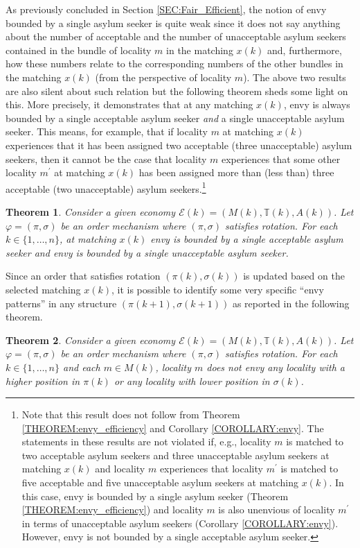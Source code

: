 \documentclass[12pt,fleqn]{article}
\newtheorem{theorem}{Theorem}
\begin{document}
\noindent As previously concluded in Section \ref{SEC:Fair_Efficient}, the notion of envy bounded by a single asylum seeker is quite weak since it does not say anything about the number of acceptable and the number of unacceptable asylum seekers contained in the bundle of locality $m$ in the matching $x(k)$ and, furthermore, how these numbers relate to the corresponding numbers of the other bundles in the matching $x(k)$ (from the perspective of locality $m$). The above two results are also silent about such relation but the following theorem sheds some light on this. More precisely, it demonstrates that at any matching $x(k)$, envy is always bounded by a single acceptable asylum seeker \emph{and} a single unacceptable asylum seeker. This means, for example, that if locality $m$ at matching $x(k)$ experiences that it has been assigned two acceptable (three unacceptable) asylum seekers, then it cannot be the case that locality $m$ experiences that some other locality $m^\prime$ at matching $x(k)$ has been assigned more than (less than) three acceptable (two unacceptable) asylum seekers.\footnote{Note that this result does not follow from Theorem \ref{THEOREM:envy_efficiency} and Corollary \ref{COROLLARY:envy}. The statements in these results are not violated if, e.g., locality $m$ is matched to two acceptable asylum seekers and three unacceptable asylum seekers at matching $x(k)$ and locality $m$ experiences that locality $m^\prime$ is matched to five acceptable and five unacceptable asylum seekers at matching $x(k)$. In this case, envy is bounded by a single asylum seeker (Theorem \ref{THEOREM:envy_efficiency}) and locality $m$ is also unenvious of locality $m^\prime$ in terms of unacceptable asylum seekers (Corollary \ref{COROLLARY:envy}). However, envy is not bounded by a single acceptable asylum seeker.}
\begin{theorem}\rm\label{TH:1_envy}
Consider a given economy $\mathcal{E}(k)=(M(k),\mathbb{T}(k),A(k))$. Let $\varphi=(\pi,\sigma)$ be an order mechanism where $(\pi,\sigma)$ satisfies rotation.
For each $k\in \{1,\ldots,n\}$, at matching $x(k)$ envy is bounded by a single acceptable asylum seeker \textit{and} envy is bounded by a single unacceptable asylum seeker.
\end{theorem}
\noindent Since an order that satisfies rotation $(\pi(k),\sigma(k))$ is updated based on the selected matching $x(k)$, it is possible to identify some very specific ``envy patterns'' in any structure $(\pi(k+1),\sigma(k+1))$ as reported in the following theorem.
\begin{theorem}\rm\label{TH:structures}
Consider a given economy $\mathcal{E}(k)=(M(k),\mathbb{T}(k),A(k))$. Let $\varphi=(\pi,\sigma)$ be an order mechanism where $(\pi,\sigma)$ satisfies rotation.
For each $k\in \{1,\ldots,n\}$ and each $m\in M(k)$, locality $m$ does not envy any
locality with a higher position in $\pi(k)$ or any locality with lower position in $\sigma(k)$.
\end{theorem}
\end{document}
